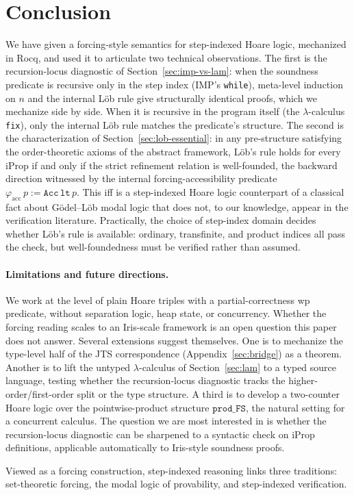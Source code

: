 \section{Conclusion}
\label{sec:conclusion}

We have given a forcing-style semantics for step-indexed Hoare logic,
mechanized in Rocq, and used it to articulate two technical
observations.  The first is the recursion-locus diagnostic of
Section~\ref{sec:imp-vs-lam}: when the soundness predicate is
recursive only in the step index (IMP's \texttt{while}), meta-level
induction on $n$ and the internal Löb rule give structurally
identical proofs, which we mechanize side by side. When it is
recursive in the program itself (the $\lambda$-calculus \texttt{fix}),
only the internal Löb rule matches the predicate's structure.  The
second is the characterization of Section~\ref{sec:lob-essential}: in
any pre-structure satisfying the order-theoretic axioms of the
abstract framework, L\"ob's rule holds for every iProp if and only if
the strict refinement relation is well-founded, the backward direction
witnessed by the internal forcing-accessibility predicate
$\varphi_{\mathrm{acc}}\, p := \mathtt{Acc}\, \mathtt{lt}\, p$.  This
iff is a step-indexed Hoare logic counterpart of a classical fact
about G\"odel--L\"ob modal logic that does not, to our knowledge,
appear in the verification literature.  Practically, the choice of
step-index domain decides whether L\"ob's rule is available:
ordinary, transfinite, and product indices all pass the check, but
well-foundedness must be verified rather than assumed.

\paragraph{Limitations and future directions.}
We work at the level of plain Hoare triples with a partial-correctness
wp predicate, without separation logic, heap state, or concurrency.
Whether the forcing reading scales to an Iris-scale framework is an
open question this paper does not answer.  Several extensions suggest
themselves.  One is to mechanize the type-level half of the JTS
correspondence (Appendix~\ref{sec:bridge}) as a theorem.  Another is
to lift the untyped $\lambda$-calculus of Section~\ref{sec:lam} to a
typed source language, testing whether the recursion-locus diagnostic
tracks the higher-order/first-order split or the type structure.  A
third is to develop a two-counter Hoare logic over the
pointwise-product structure $\mathtt{prod\_FS}$, the natural setting
for a concurrent calculus.
The question we are most interested in is whether the recursion-locus
diagnostic can be sharpened to a syntactic check on iProp definitions,
applicable automatically to Iris-style soundness proofs.

Viewed as a forcing construction, step-indexed reasoning links three
traditions: set-theoretic forcing, the modal logic of provability, and
step-indexed verification.
